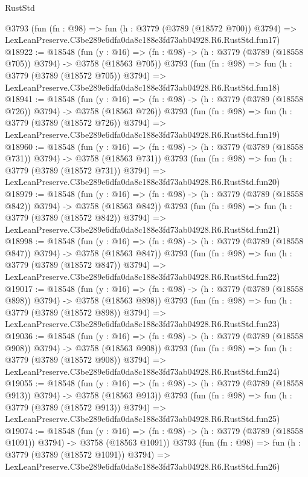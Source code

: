 \begin{lexlean}{RustStd}
\begin{coremodule}
    @3793
    (fun (fn : @98) =>
    fun (h : @3779 (@3789 (@18572 @700)) @3794) =>
    LexLeanPreserve.C3be289e6dfa0da8c188e3fd73ab04928.R6.RustStd.fun17)
@18922 := @18548
    (fun (y : @16) => (fn : @98) -> (h : @3779 (@3789 (@18558 @705)) @3794) -> @3758 (@18563 @705))
    @3793
    (fun (fn : @98) =>
    fun (h : @3779 (@3789 (@18572 @705)) @3794) =>
    LexLeanPreserve.C3be289e6dfa0da8c188e3fd73ab04928.R6.RustStd.fun18)
@18941 := @18548
    (fun (y : @16) => (fn : @98) -> (h : @3779 (@3789 (@18558 @726)) @3794) -> @3758 (@18563 @726))
    @3793
    (fun (fn : @98) =>
    fun (h : @3779 (@3789 (@18572 @726)) @3794) =>
    LexLeanPreserve.C3be289e6dfa0da8c188e3fd73ab04928.R6.RustStd.fun19)
@18960 := @18548
    (fun (y : @16) => (fn : @98) -> (h : @3779 (@3789 (@18558 @731)) @3794) -> @3758 (@18563 @731))
    @3793
    (fun (fn : @98) =>
    fun (h : @3779 (@3789 (@18572 @731)) @3794) =>
    LexLeanPreserve.C3be289e6dfa0da8c188e3fd73ab04928.R6.RustStd.fun20)
@18979 := @18548
    (fun (y : @16) => (fn : @98) -> (h : @3779 (@3789 (@18558 @842)) @3794) -> @3758 (@18563 @842))
    @3793
    (fun (fn : @98) =>
    fun (h : @3779 (@3789 (@18572 @842)) @3794) =>
    LexLeanPreserve.C3be289e6dfa0da8c188e3fd73ab04928.R6.RustStd.fun21)
@18998 := @18548
    (fun (y : @16) => (fn : @98) -> (h : @3779 (@3789 (@18558 @847)) @3794) -> @3758 (@18563 @847))
    @3793
    (fun (fn : @98) =>
    fun (h : @3779 (@3789 (@18572 @847)) @3794) =>
    LexLeanPreserve.C3be289e6dfa0da8c188e3fd73ab04928.R6.RustStd.fun22)
@19017 := @18548
    (fun (y : @16) => (fn : @98) -> (h : @3779 (@3789 (@18558 @898)) @3794) -> @3758 (@18563 @898))
    @3793
    (fun (fn : @98) =>
    fun (h : @3779 (@3789 (@18572 @898)) @3794) =>
    LexLeanPreserve.C3be289e6dfa0da8c188e3fd73ab04928.R6.RustStd.fun23)
@19036 := @18548
    (fun (y : @16) => (fn : @98) -> (h : @3779 (@3789 (@18558 @908)) @3794) -> @3758 (@18563 @908))
    @3793
    (fun (fn : @98) =>
    fun (h : @3779 (@3789 (@18572 @908)) @3794) =>
    LexLeanPreserve.C3be289e6dfa0da8c188e3fd73ab04928.R6.RustStd.fun24)
@19055 := @18548
    (fun (y : @16) => (fn : @98) -> (h : @3779 (@3789 (@18558 @913)) @3794) -> @3758 (@18563 @913))
    @3793
    (fun (fn : @98) =>
    fun (h : @3779 (@3789 (@18572 @913)) @3794) =>
    LexLeanPreserve.C3be289e6dfa0da8c188e3fd73ab04928.R6.RustStd.fun25)
@19074 := @18548
    (fun (y : @16) =>
    (fn : @98) -> (h : @3779 (@3789 (@18558 @1091)) @3794) -> @3758 (@18563 @1091))
    @3793
    (fun (fn : @98) =>
    fun (h : @3779 (@3789 (@18572 @1091)) @3794) =>
    LexLeanPreserve.C3be289e6dfa0da8c188e3fd73ab04928.R6.RustStd.fun26)

\end{coremodule}
\end{lexlean}

